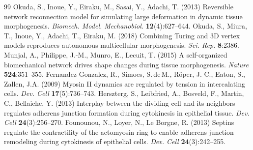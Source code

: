\documentclass[10pt,a4paper]{article}
\begin{document}
{\small
\begin{thebibliography}{99}\setlength{\itemsep}{0pt}
 Okuda, S., Inoue, Y., Eiraku, M., Sasai, Y., Adachi, T. (2013) Reversible network
reconnection model for simulating large deformation in dynamic tissue morphogenesis.
\emph{Biomech. Model. Mechanobiol.} \textbf{12}(4):627--644.
 Okuda, S., Miura, T., Inoue, Y., Adachi, T., Eiraku, M. (2018) Combining Turing and
3D vertex models reproduces autonomous multicellular morphogenesis. \emph{Sci. Rep.} \textbf{8}:2386.
 Munjal, A., Philippe, J.-M., Munro, E., Lecuit, T. (2015) A self-organized
biomechanical network drives shape changes during tissue morphogenesis. \emph{Nature} \textbf{524}:351--355.
 Fernandez-Gonzalez, R., Simoes, S.\,de\,M., R\"oper, J.-C., Eaton, S., Zallen, J.A.
(2009) Myosin II dynamics are regulated by tension in intercalating cells. \emph{Dev. Cell}
\textbf{17}(5):736--743.
 Herszterg, S., Leibfried, A., Bosveld, F., Martin, C., Bellaiche, Y. (2013)
Interplay between the dividing cell and its neighbors regulates adherens junction formation during
cytokinesis in epithelial tissue. \emph{Dev. Cell} \textbf{24}(3):256--270.
 Founounou, N., Loyer, N., Le Borgne, R. (2013) Septins regulate the
contractility of the actomyosin ring to enable adherens junction remodeling during cytokinesis of
epithelial cells. \emph{Dev. Cell} \textbf{24}(3):242--255.
\end{thebibliography}}
\end{document}
